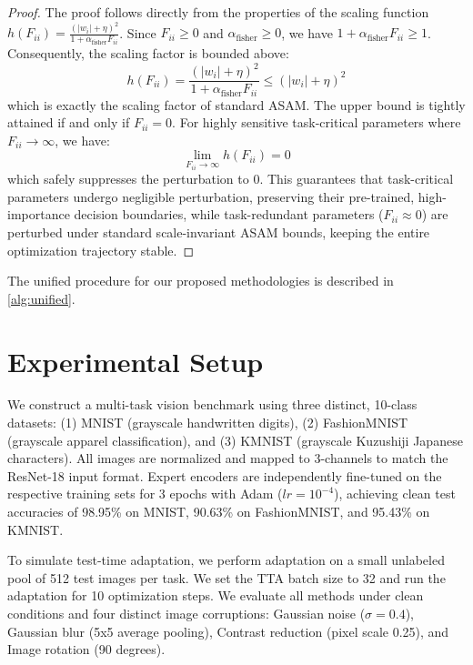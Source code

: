 \documentclass{article}
\theoremstyle{plain}
\theoremstyle{definition}
\theoremstyle{remark}
\begin{document}
\begin{proof}
The proof follows directly from the properties of the scaling function $h(F_{ii}) = \frac{(|w_i| + \eta)^2}{1 + \alpha_{\text{fisher}} F_{ii}}$. Since $F_{ii} \ge 0$ and $\alpha_{\text{fisher}} \ge 0$, we have $1 + \alpha_{\text{fisher}} F_{ii} \ge 1$. Consequently, the scaling factor is bounded above:
\begin{equation}
    h(F_{ii}) = \frac{(|w_i| + \eta)^2}{1 + \alpha_{\text{fisher}} F_{ii}} \le (|w_i| + \eta)^2
\end{equation}
which is exactly the scaling factor of standard ASAM. The upper bound is tightly attained if and only if $F_{ii} = 0$. For highly sensitive task-critical parameters where $F_{ii} \to \infty$, we have:
\begin{equation}
    \lim_{F_{ii} \to \infty} h(F_{ii}) = 0
\end{equation}
which safely suppresses the perturbation to 0. This guarantees that task-critical parameters undergo negligible perturbation, preserving their pre-trained, high-importance decision boundaries, while task-redundant parameters ($F_{ii} \approx 0$) are perturbed under standard scale-invariant ASAM bounds, keeping the entire optimization trajectory stable.
\end{proof}

The unified procedure for our proposed methodologies is described in \cref{alg:unified}.

\section{Experimental Setup}
\label{sec:setup}
We construct a multi-task vision benchmark using three distinct, 10-class datasets: (1) MNIST (grayscale handwritten digits), (2) FashionMNIST (grayscale apparel classification), and (3) KMNIST (grayscale Kuzushiji Japanese characters). All images are normalized and mapped to 3-channels to match the ResNet-18 input format. Expert encoders are independently fine-tuned on the respective training sets for 3 epochs with Adam ($lr=10^{-4}$), achieving clean test accuracies of 98.95\% on MNIST, 90.63\% on FashionMNIST, and 95.43\% on KMNIST.

To simulate test-time adaptation, we perform adaptation on a small unlabeled pool of 512 test images per task. We set the TTA batch size to 32 and run the adaptation for 10 optimization steps. We evaluate all methods under clean conditions and four distinct image corruptions: Gaussian noise ($\sigma=0.4$), Gaussian blur (5x5 average pooling), Contrast reduction (pixel scale 0.25), and Image rotation (90 degrees).
\end{document}
